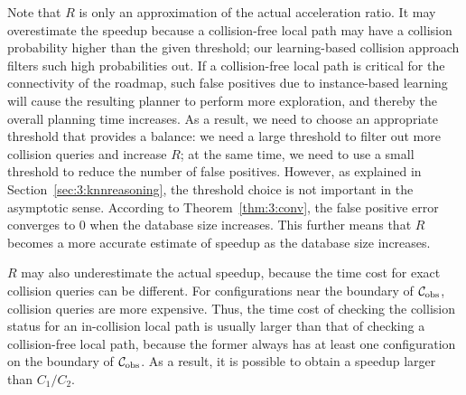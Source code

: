 Note that $R$ is only an approximation of the actual acceleration ratio. It may overestimate the speedup because a collision-free local path may have a collision probability higher than the given threshold; our learning-based collision approach filters such high probabilities out. If a collision-free local path is critical for the connectivity of the roadmap, such false positives due to instance-based learning will cause the resulting planner to perform more exploration, and thereby the overall planning time increases. As a result, we need to choose an appropriate threshold that provides a balance: we need a large threshold to filter out more collision queries and increase $R$; at the same time, we need to use a small threshold to reduce the number of false positives. However, as explained in Section~\ref{sec:3:knnreasoning}, the threshold choice is not important in the asymptotic sense. According to Theorem~\ref{thm:3:conv}, the false positive error converges to $0$ when the database size increases. This further means that $R$ becomes a more accurate estimate of speedup as the database size increases.

$R$ may also underestimate the actual speedup, because the time cost for exact collision queries can be different. For configurations near the boundary of $\mathcal C_{\text{obs}}$, collision queries are more expensive. Thus, the time cost of checking the collision status for an in-collision local path is usually larger than that of checking a collision-free local path, because the former always has at least one configuration on the boundary of $\mathcal C_{\text{obs}}$. As a result, it is possible to obtain a speedup larger than $C_1 / C_2$.

